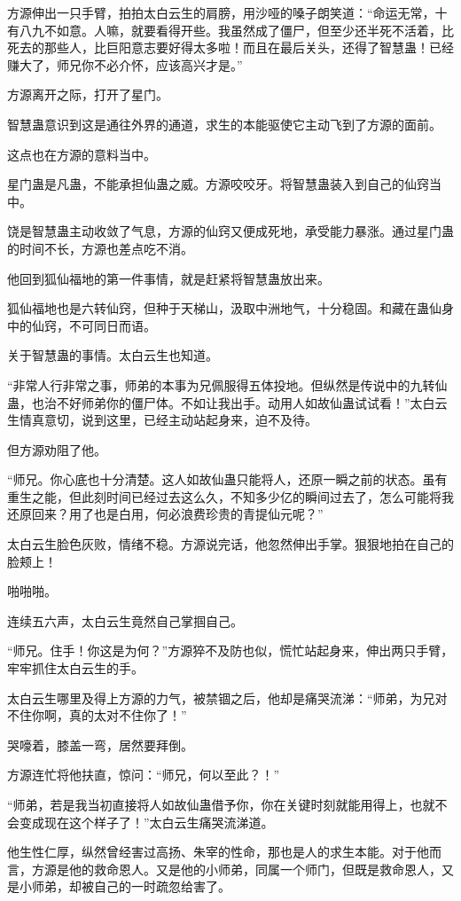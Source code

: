 \begin{this_body}
方源伸出一只手臂，拍拍太白云生的肩膀，用沙哑的嗓子朗笑道：“命运无常，十有八九不如意。人嘛，就要看得开些。我虽然成了僵尸，但至少还半死不活着，比死去的那些人，比巨阳意志要好得太多啦！而且在最后关头，还得了智慧蛊！已经赚大了，师兄你不必介怀，应该高兴才是。”

方源离开之际，打开了星门。

智慧蛊意识到这是通往外界的通道，求生的本能驱使它主动飞到了方源的面前。

这点也在方源的意料当中。

星门蛊是凡蛊，不能承担仙蛊之威。方源咬咬牙。将智慧蛊装入到自己的仙窍当中。

饶是智慧蛊主动收敛了气息，方源的仙窍又便成死地，承受能力暴涨。通过星门蛊的时间不长，方源也差点吃不消。

他回到狐仙福地的第一件事情，就是赶紧将智慧蛊放出来。

狐仙福地也是六转仙窍，但种于天梯山，汲取中洲地气，十分稳固。和藏在蛊仙身中的仙窍，不可同日而语。

关于智慧蛊的事情。太白云生也知道。

“非常人行非常之事，师弟的本事为兄佩服得五体投地。但纵然是传说中的九转仙蛊，也治不好师弟你的僵尸体。不如让我出手。动用人如故仙蛊试试看！”太白云生情真意切，说到这里，已经主动站起身来，迫不及待。

但方源劝阻了他。

“师兄。你心底也十分清楚。这人如故仙蛊只能将人，还原一瞬之前的状态。虽有重生之能，但此刻时间已经过去这么久，不知多少亿的瞬间过去了，怎么可能将我还原回来？用了也是白用，何必浪费珍贵的青提仙元呢？”

太白云生脸色灰败，情绪不稳。方源说完话，他忽然伸出手掌。狠狠地拍在自己的脸颊上！

啪啪啪。

连续五六声，太白云生竟然自己掌掴自己。

“师兄。住手！你这是为何？”方源猝不及防也似，慌忙站起身来，伸出两只手臂，牢牢抓住太白云生的手。

太白云生哪里及得上方源的力气，被禁锢之后，他却是痛哭流涕：“师弟，为兄对不住你啊，真的太对不住你了！”

哭嚎着，膝盖一弯，居然要拜倒。

方源连忙将他扶直，惊问：“师兄，何以至此？！”

“师弟，若是我当初直接将人如故仙蛊借予你，你在关键时刻就能用得上，也就不会变成现在这个样子了！”太白云生痛哭流涕道。

他生性仁厚，纵然曾经害过高扬、朱宰的性命，那也是人的求生本能。对于他而言，方源是他的救命恩人。又是他的小师弟，同属一个师门，但既是救命恩人，又是小师弟，却被自己的一时疏忽给害了。


\end{this_body}
